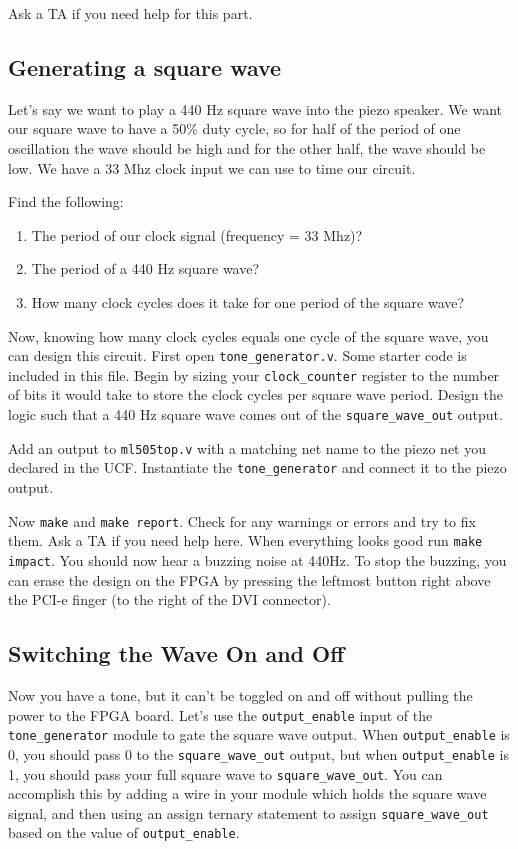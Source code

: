 \documentclass[11pt]{article}
\begin{document}
Ask a TA if you need help for this part.

\subsection{Generating a square wave}
Let's say we want to play a 440 Hz square wave into the piezo speaker. We want our square wave to have a 50\% duty cycle, so for half of the period of one oscillation the wave should be high and for the other half, the wave should be low. We have a 33 Mhz clock input we can use to time our circuit.

Find the following:
\begin{enumerate}
	\item The period of our clock signal (frequency = 33 Mhz)?
	\item The period of a 440 Hz square wave?
	\item How many clock cycles does it take for one period of the square wave?
\end{enumerate}

Now, knowing how many clock cycles equals one cycle of the square wave, you can design this circuit. First open \verb|tone_generator.v|. Some starter code is included in this file. Begin by sizing your \verb|clock_counter| register to the number of bits it would take to store the clock cycles per square wave period. Design the logic such that a 440 Hz square wave comes out of the \verb|square_wave_out| output.

Add an output to \verb|ml505top.v| with a matching net name to the piezo net you declared in the UCF. Instantiate the \verb|tone_generator| and connect it to the piezo output.

Now \verb|make| and \verb|make report|. Check for any warnings or errors and try to fix them. Ask a TA if you need help here. When everything looks good run \verb|make impact|. You should now hear a buzzing noise at 440Hz. To stop the buzzing, you can erase the design on the FPGA by pressing the leftmost button right above the PCI-e finger (to the right of the DVI connector).

\subsection{Switching the Wave On and Off}
Now you have a tone, but it can't be toggled on and off without pulling the power to the FPGA board. Let's use the \verb|output_enable| input of the \verb|tone_generator| module to gate the square wave output. When \verb|output_enable| is 0, you should pass 0 to the \verb|square_wave_out| output, but when \verb|output_enable| is 1, you should pass your full square wave to \verb|square_wave_out|. You can accomplish this by adding a wire in your module which holds the square wave signal, and then using an assign ternary statement to assign \verb|square_wave_out| based on the value of \verb|output_enable|.
\end{document}
